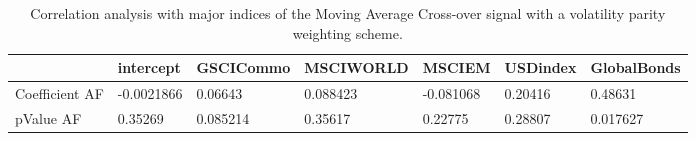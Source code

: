 \begin{table}[H]
\centering
\begin{tabular}{lllllll}
& intercept & GSCICommo & MSCIWORLD & MSCIEM & USDindex & GlobalBonds \\ 
\hline 
Coefficient AF & -0.0021866 & 0.06643 & 0.088423 & -0.081068 & 0.20416 & 0.48631 \\ 
pValue AF & 0.35269 & 0.085214 & 0.35617 & 0.22775 & 0.28807 & 0.017627 \\ 
\hline
\end{tabular}
\caption{Correlation analysis with major indices of the Moving Average Cross-over signal with a volatility parity weighting scheme.}
\label{MAVP_AFACTOR}
\end{table}